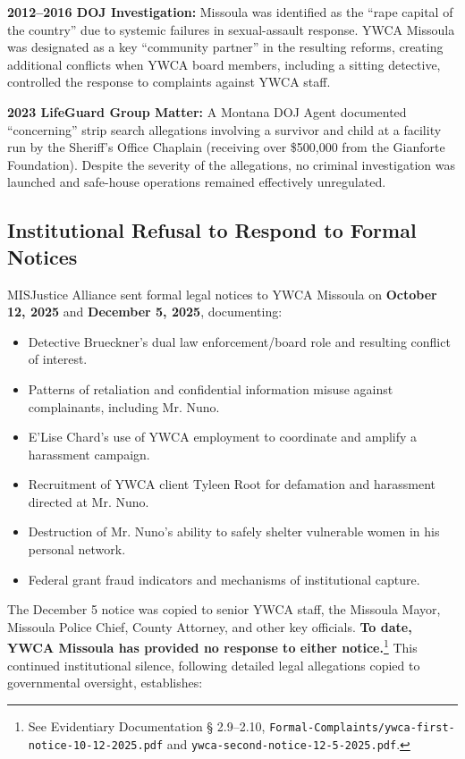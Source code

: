\documentclass[12pt,oneside]{article}
\begin{document}
\begin{flushleft}
\textbf{2012--2016 DOJ Investigation:} Missoula was identified as the “rape capital of the country” due to systemic failures in sexual-assault response. YWCA Missoula was designated as a key “community partner” in the resulting reforms, creating additional conflicts when YWCA board members, including a sitting detective, controlled the response to complaints against YWCA staff.

\textbf{2023 LifeGuard Group Matter:} A Montana DOJ Agent documented “concerning” strip search allegations involving a survivor and child at a facility run by the Sheriff’s Office Chaplain (receiving over \$500,000 from the Gianforte Foundation). Despite the severity of the allegations, no criminal investigation was launched and safe-house operations remained effectively unregulated.

\subsection*{Institutional Refusal to Respond to Formal Notices}

MISJustice Alliance sent formal legal notices to YWCA Missoula on \textbf{October 12, 2025} and \textbf{December 5, 2025}, documenting:

\begin{itemize}
\item Detective Brueckner’s dual law enforcement/board role and resulting conflict of interest.
\item Patterns of retaliation and confidential information misuse against complainants, including Mr. Nuno.
\item E'Lise Chard’s use of YWCA employment to coordinate and amplify a harassment campaign.
\item Recruitment of YWCA client Tyleen Root for defamation and harassment directed at Mr. Nuno.
\item Destruction of Mr. Nuno’s ability to safely shelter vulnerable women in his personal network.
\item Federal grant fraud indicators and mechanisms of institutional capture.
\end{itemize}

The December 5 notice was copied to senior YWCA staff, the Missoula Mayor, Missoula Police Chief, County Attorney, and other key officials. \textbf{To date, YWCA Missoula has provided no response to either notice.}\footnote{See Evidentiary Documentation \S{} 2.9--2.10, \texttt{Formal-Complaints/ywca-first-notice-10-12-2025.pdf} and \texttt{ywca-second-notice-12-5-2025.pdf}.} This continued institutional silence, following detailed legal allegations copied to governmental oversight, establishes:


\end{flushleft}
\end{document}
